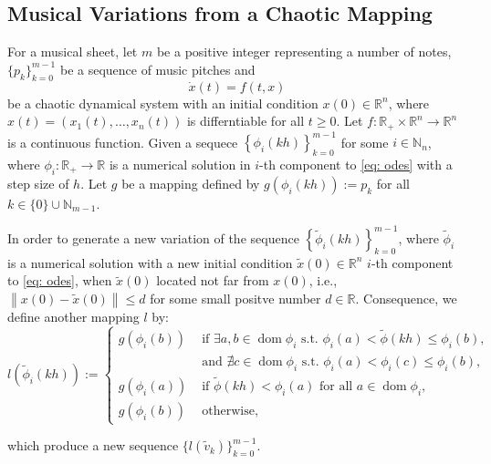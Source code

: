 \documentclass[11pt]{article}
\theoremstyle{definition}
\DeclareMathOperator{\dom}{dom}
\begin{document}
\subsection{Musical Variations from a Chaotic Mapping}

\label{ss: mvfacm}
For a musical sheet, let $m$ be a positive integer representing a number of notes, $\{p_k\}_{k=0}^{m-1}$ be a sequence of music pitches and   
\begin{equation} \label{eq: odes}
\dot{x}(t) = f(t,x)
\end{equation}
be a chaotic dynamical system with an initial condition $x(0) \in \mathbb{R}^n$, where $x(t) = \left(x_1(t), \ldots, x_n(t)\right)$ is differntiable for all $t \geq 0$.
Let $f: \mathbb{R}_{+} \times \mathbb{R}^n \to \mathbb{R}^n$ is a continuous function. 
Given a sequece
$ \displaystyle\left\{\phi_i(kh) \right\}_{k=0}^{m-1}$ 
for some $i \in \mathbb{N}_n$, where $\phi_i:\mathbb{R}_+ \to \mathbb{R}$ is a numerical solution in $i$-th component to \eqref{eq: odes} with a step size of $h$.
Let $g$ be a mapping defined by 
$g(\phi_i(kh)) := p_k$ for all $k \in \{0\}\cup\mathbb{N}_{m-1}$.

In order to generate a new variation of the sequence $ \left\{\tilde{\phi}_i(kh) \right\}_{k=0}^{m-1} $, where $\tilde{\phi}_i$ is a numerical solution with a new initial condition $\tilde{x}(0) \in \mathbb{R}^n$ $i$-th component to \eqref{eq: odes}, 
when $\tilde{x}(0)$ located not far from $x(0)$, i.e., $ \left\lVert x(0) - \tilde{x}(0) \right\rVert \leq d$ for some small positve number $d \in \mathbb{R}$. Consequence, we define another mapping $l$ by: 
\[ l\left(\tilde{\phi}_i(kh)\right) := 
\begin{cases}
  g(\phi_i(b)) & \text{ if }\exists a, b \in \dom{\phi_i} \text{ s.t. } \phi_i(a) < \tilde{\phi}(kh) \leq \phi_i(b), \\
  & \text{ and } \nexists c \in \dom{\phi_i} \text{ s.t. } \phi_i(a) < \phi_i(c) \leq \phi_i(b), \\
  g(\phi_i(a)) & \text{ if } \tilde{\phi}(kh) < \phi_i(a) \text{ for all } a \in \dom{\phi_i}, \\
  g(\phi_i(b)) & \text{ otherwise},
\end{cases}
\]

which produce a new sequence $\{ l(\tilde{v}_k) \}_{k = 0}^{m - 1}$. 
\end{document}
